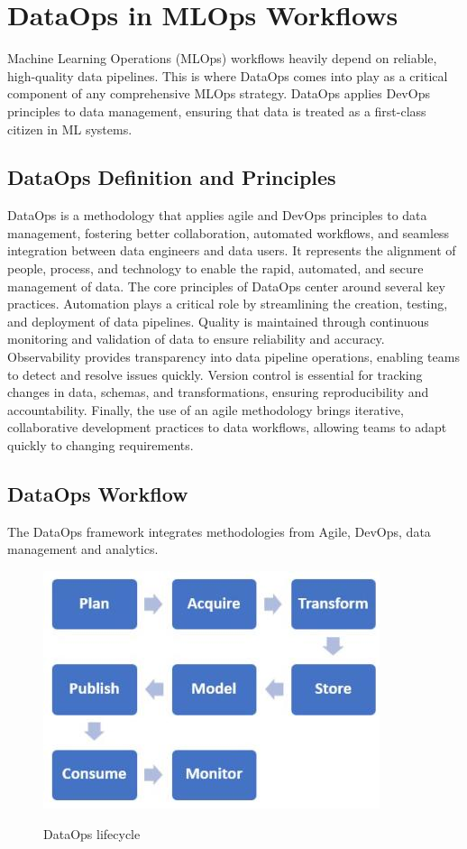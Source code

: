 \section{DataOps in MLOps Workflows}\label{sec:dataops}
Machine Learning Operations (MLOps) workflows heavily depend on reliable, high-quality data pipelines\cite{dataops-mlops}.
This is where DataOps comes into play as a critical component of any comprehensive MLOps strategy.
DataOps applies DevOps principles to data management, ensuring that data is treated as a first-class citizen in ML systems.

\subsection{DataOps Definition and Principles}\label{subsec:dataops-definition}

DataOps is a methodology that applies agile and DevOps principles to data management, fostering better collaboration,
automated workflows, and seamless integration between data engineers and data users\cite{ad-hoc-dataops}.
It represents the alignment of people, process, and technology to enable the rapid, automated, and secure management of data.
The core principles of DataOps center around several key practices.
Automation plays a critical role by streamlining the creation, testing, and deployment of data pipelines.
Quality is maintained through continuous monitoring and validation of data to ensure reliability and accuracy.
Observability provides transparency into data pipeline operations, enabling teams to detect and resolve issues quickly.
Version control is essential for tracking changes in data, schemas, and transformations, ensuring reproducibility and accountability.
Finally, the use of an agile methodology brings iterative, collaborative development practices to data workflows, allowing teams to adapt quickly to changing requirements.

\subsection{DataOps Workflow}\label{subsec:dataops-workflow}
The DataOps framework integrates methodologies from Agile, DevOps, data management and analytics.

\begin{figure}[!htbp]
    \caption{DataOps lifecycle\cite{FANNOUCH2025100321}}
    \centering
    \includegraphics[scale=0.5]{images/dataops-workflow}
    \label{fig:dataops-workflow}
\end{figure}

